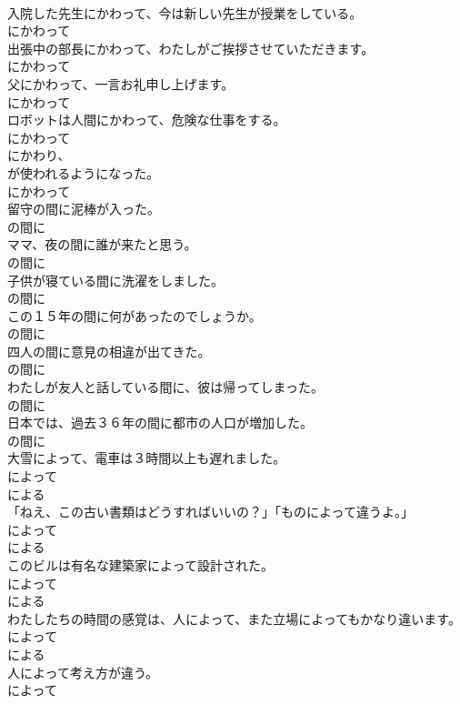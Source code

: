 \documentclass[8pt]{extreport}
\begin{document}
\begin{CJK}{UTF8}{min}
\\	入院した先生にかわって、今は新しい先生が授業をしている。	
\\	にかわって
\\	出張中の部長にかわって、わたしがご挨拶させていただきます。	
\\	にかわって
\\	父にかわって、一言お礼申し上げます。	
\\	にかわって
\\	ロボットは人間にかわって、危険な仕事をする。	
\\	にかわって
\\	にかわり、
\\	が使われるようになった。	
\\	にかわって
\\	留守の間に泥棒が入った。	
\\	の間に
\\	ママ、夜の間に誰が来たと思う。	
\\	の間に
\\	子供が寝ている間に洗濯をしました。	
\\	の間に
\\	この１５年の間に何があったのでしょうか。	
\\	の間に
\\	四人の間に意見の相違が出てきた。	
\\	の間に
\\	わたしが友人と話している間に、彼は帰ってしまった。	
\\	の間に
\\	日本では、過去３６年の間に都市の人口が増加した。	
\\	の間に
\\	大雪によって、電車は３時間以上も遅れました。	
\\	によって 
\\	による
\\	「ねえ、この古い書類はどうすればいいの？」「ものによって違うよ。」	
\\	によって 
\\	による
\\	このビルは有名な建築家によって設計された。	
\\	によって 
\\	による
\\	わたしたちの時間の感覚は、人によって、また立場によってもかなり違います。	
\\	によって 
\\	による
\\	人によって考え方が違う。	
\\	によって 

\end{CJK}
\end{document}
